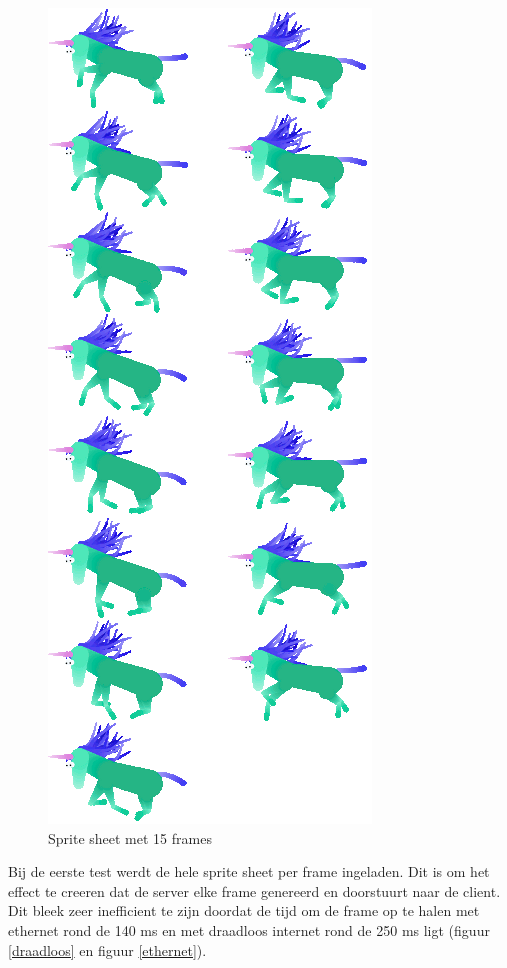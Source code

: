\begin{figure}[H]
\centering
\includegraphics[scale=0.7]{img/charging.png}
\caption{Sprite sheet met 15 frames} \label{sheet}
\end{figure}

Bij de eerste test werdt de hele sprite sheet per frame ingeladen. Dit is om het effect te creeren dat de server elke frame genereerd en doorstuurt naar de client. Dit bleek zeer inefficient te zijn doordat de tijd om de frame op te halen met ethernet rond de 140 ms en met draadloos internet rond de 250 ms ligt (figuur \ref{draadloos} en figuur \ref{ethernet}).

